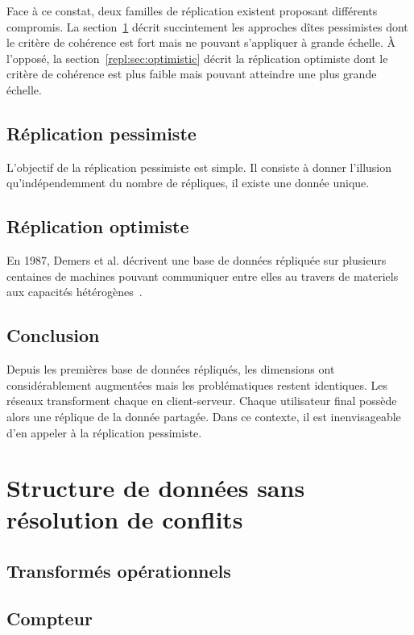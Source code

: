Face à ce constat, deux familles de réplication existent proposant différents
compromis. La section~\ref{repl:sec:pessimistic} décrit succintement les
approches dîtes pessimistes dont le critère de cohérence est fort mais ne
pouvant s'appliquer à grande échelle. À l'opposé, la
section~\ref{repl:sec:optimistic} décrit la réplication optimiste dont le
critère de cohérence est plus faible mais pouvant atteindre une plus grande
échelle.

\section{Réplication pessimiste}
\label{repl:sec:pessimistic}

L'objectif de la réplication pessimiste est simple. Il consiste à donner
l'illusion qu'indépendemment du nombre de répliques, il existe une donnée
unique.

\section{Réplication optimiste}

En 1987, Demers et al. décrivent une base de données répliquée sur plusieurs
centaines de machines pouvant communiquer entre elles au travers de materiels
aux capacités hétérogènes~\cite{demers1987epidemic}.

\section{Conclusion}

Depuis les premières base de données répliqués, les dimensions ont
considérablement augmentées mais les problématiques restent identiques. Les
réseaux  transforment chaque  en
client-serveur. Chaque utilisateur final possède alors une réplique de la donnée
partagée. Dans ce contexte, il est inenvisageable d'en appeler à la réplication
pessimiste. 




\chapter{Structure de données sans résolution de conflits}
\section{Transformés opérationnels}
\section{Compteur}
